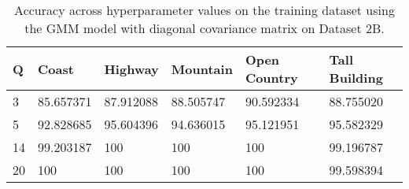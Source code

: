 \begin{table}[H]
\centering
\begin{tabular}{l l l l l l}
\hline
\hline
\textbf{Q} & \textbf{Coast} & \textbf{Highway} & \textbf{Mountain} & \textbf{Open Country} & \textbf{Tall Building} \\
\hline
\hline
3 & 85.657371 & 87.912088 & 88.505747 & 90.592334 & 88.755020\\
5 & 92.828685 & 95.604396 & 94.636015 & 95.121951 & 95.582329 \\
14 & 99.203187 & 100 & 100 & 100 & 99.196787 \\
20 & 100 & 100 & 100 & 100 & 99.598394 \\
\hline
\end{tabular}
\caption{Accuracy across hyperparameter values on the training dataset using the GMM model with diagonal covariance matrix on Dataset 2B.}
\label{tab:1b_full}
\end{table}

